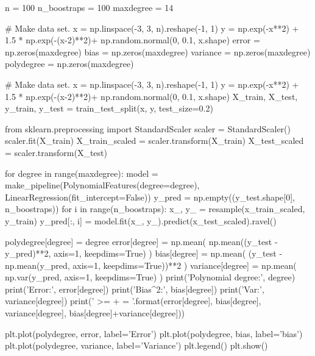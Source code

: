 \documentclass[%
oneside,                 %
final,                   %
10pt]{article}
\begin{document}
n = 100
n_boostraps = 100
maxdegree = 14

# Make data set.
x = np.linspace(-3, 3, n).reshape(-1, 1)
y = np.exp(-x**2) + 1.5 * np.exp(-(x-2)**2)+ np.random.normal(0, 0.1, x.shape)
error = np.zeros(maxdegree)
bias = np.zeros(maxdegree)
variance = np.zeros(maxdegree)
polydegree = np.zeros(maxdegree)


# Make data set.
x = np.linspace(-3, 3, n).reshape(-1, 1)
y = np.exp(-x**2) + 1.5 * np.exp(-(x-2)**2)+ np.random.normal(0, 0.1, x.shape)
X_train, X_test, y_train, y_test = train_test_split(x, y, test_size=0.2)

from sklearn.preprocessing import StandardScaler
scaler = StandardScaler()
scaler.fit(X_train)
X_train_scaled = scaler.transform(X_train)
X_test_scaled = scaler.transform(X_test)

for degree in range(maxdegree):
    model = make_pipeline(PolynomialFeatures(degree=degree), LinearRegression(fit_intercept=False))
    y_pred = np.empty((y_test.shape[0], n_boostraps))
    for i in range(n_boostraps):
        x_, y_ = resample(x_train_scaled, y_train)
        y_pred[:, i] = model.fit(x_, y_).predict(x_test_scaled).ravel()

    polydegree[degree] = degree
    error[degree] = np.mean( np.mean((y_test - y_pred)**2, axis=1, keepdims=True) )
    bias[degree] = np.mean( (y_test - np.mean(y_pred, axis=1, keepdims=True))**2 )
    variance[degree] = np.mean( np.var(y_pred, axis=1, keepdims=True) )
    print('Polynomial degree:', degree)
    print('Error:', error[degree])
    print('Bias^2:', bias[degree])
    print('Var:', variance[degree])
    print('{} >= {} + {} = {}'.format(error[degree], bias[degree], variance[degree], bias[degree]+variance[degree]))

plt.plot(polydegree, error, label='Error')
plt.plot(polydegree, bias, label='bias')
plt.plot(polydegree, variance, label='Variance')
plt.legend()
plt.show()



\epycod




\end{document}
